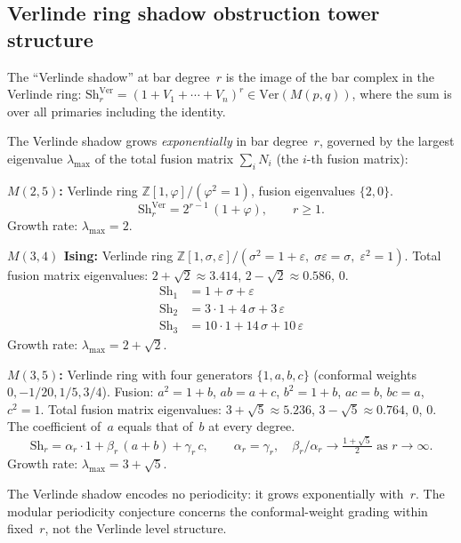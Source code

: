 \documentclass[11pt]{article}
\newcommand{\Z}{\mathbb{Z}}
\begin{document}
\subsection{Verlinde ring shadow obstruction tower structure}
\label{subsec:mp-verlinde}

The ``Verlinde shadow'' at bar degree~$r$ is the image of
the bar complex in the Verlinde ring:
$\mathrm{Sh}_r^{\mathrm{Ver}} = (1 + V_1 + \cdots + V_n)^r
\in \mathrm{Ver}(M(p,q))$,
where the sum is over all primaries including the identity.

\begin{computation}
\label{comp:verlinde-shadows}
The Verlinde shadow grows \emph{exponentially} in bar degree~$r$,
governed by the largest eigenvalue $\lambda_{\max}$ of the
total fusion matrix $\sum_i N_i$ (the $i$-th fusion matrix):

\smallskip\noindent
\textbf{$M(2,5)$:}
Verlinde ring $\Z[1,\varphi]/(\varphi^2 = 1)$,
fusion eigenvalues $\{2, 0\}$.
\[
\mathrm{Sh}_r^{\mathrm{Ver}}
= 2^{r-1}\,(1 + \varphi), \qquad r \ge 1.
\]
Growth rate: $\lambda_{\max} = 2$.

\smallskip\noindent
\textbf{$M(3,4)$ Ising:}
Verlinde ring $\Z[1,\sigma,\varepsilon]/(\sigma^2 = 1+\varepsilon,\;
\sigma\varepsilon = \sigma,\; \varepsilon^2 = 1)$.
Total fusion matrix eigenvalues: $2 + \sqrt{2} \approx 3.414$,
$2 - \sqrt{2} \approx 0.586$, $0$.
\begin{align*}
\mathrm{Sh}_1 &= 1 + \sigma + \varepsilon \\
\mathrm{Sh}_2 &= 3 \cdot 1 + 4\,\sigma + 3\,\varepsilon \\
\mathrm{Sh}_3 &= 10 \cdot 1 + 14\,\sigma + 10\,\varepsilon
\end{align*}
Growth rate: $\lambda_{\max} = 2 + \sqrt{2}$.

\smallskip\noindent
\textbf{$M(3,5)$:}
Verlinde ring with four generators $\{1, a, b, c\}$
(conformal weights $0, -1/20, 1/5, 3/4$).
Fusion: $a^2 = 1 + b$, $ab = a + c$, $b^2 = 1 + b$,
$ac = b$, $bc = a$, $c^2 = 1$.
Total fusion matrix eigenvalues:
$3 + \sqrt{5} \approx 5.236$, $3 - \sqrt{5} \approx 0.764$, $0$, $0$.
The coefficient of~$a$ equals that of~$b$ at every degree.
\[
\mathrm{Sh}_r
= \alpha_r \cdot 1 + \beta_r \,(a + b) + \gamma_r \, c,
\qquad \alpha_r = \gamma_r, \quad
\beta_r / \alpha_r \to \tfrac{1+\sqrt{5}}{2}
\text{ as } r \to \infty.
\]
Growth rate: $\lambda_{\max} = 3 + \sqrt{5}$.

\medskip\noindent
The Verlinde shadow encodes no periodicity: it grows
exponentially with~$r$.  The modular periodicity conjecture
concerns the conformal-weight grading within fixed~$r$,
not the Verlinde level structure.
\end{computation}
\end{document}
